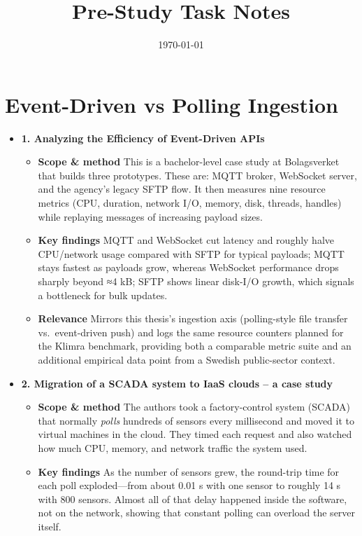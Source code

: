 \documentclass[11pt]{article}
\title{Pre-Study Task Notes}
\date{\today}
\begin{document}
\maketitle

\section*{Event-Driven vs Polling Ingestion}
\begin{itemize}
  \item[] \textbf{1. Analyzing the Efficiency of Event-Driven APIs}
  \begin{itemize}
      \item[] \textbf{Scope \& method}  This is a bachelor-level case study at Bolagsverket that builds three prototypes. These are: MQTT broker, WebSocket server, and the agency's legacy SFTP flow. It then measures nine resource metrics (CPU, duration, network I/O, memory, disk, threads, handles) while replaying messages of increasing payload sizes.
      
      \item[] \textbf{Key findings}  MQTT and WebSocket cut latency and roughly halve CPU/network usage compared with SFTP for typical payloads; MQTT stays fastest as payloads grow, whereas WebSocket performance drops sharply beyond ≈4 kB; SFTP shows linear disk-I/O growth, which signals a bottleneck for bulk updates.
      
      \item[] \textbf{Relevance}  Mirrors this thesis's ingestion axis (polling-style file transfer vs.\ event-driven push) and logs the same resource counters planned for the Klimra benchmark, providing both a comparable metric suite and an additional empirical data point from a Swedish public-sector context.
  \end{itemize}
  \item[] \textbf{2. Migration of a SCADA system to IaaS clouds – a case study}
  \begin{itemize}
      \item[] \textbf{Scope \& method} The authors took a factory-control system (SCADA) that normally \emph{polls} hundreds of sensors every millisecond and moved it to virtual machines in the cloud.  They timed each request and also watched how much CPU, memory, and network traffic the system used.
      
      \item[] \textbf{Key findings} As the number of sensors grew, the round-trip time for each poll exploded—from about 0.01 s with one sensor to roughly 14 s with 800 sensors.  Almost all of that delay happened inside the software, not on the network, showing that constant polling can overload the server itself.
      

\end{itemize}
\end{itemize}
\end{document}
